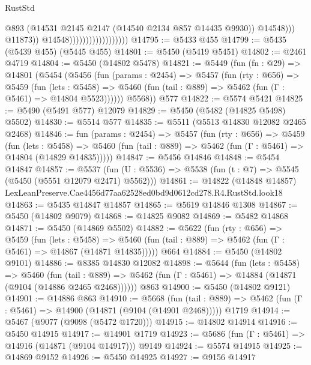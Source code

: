 \begin{lexlean}{RustStd}
\begin{coremodule}
                                                  @893
                                                  (@14531
                                                    @2145
                                                    @2147
                                                    (@14540 @2134 @857 @14435 @9930))
                                                  @14548)))
                                            @11873))
                                        @14548))))))))))))))))))
@14795 := @5433 @455
@14799 := @5435 (@5439 @455) (@5445 @455)
@14801 := @5450 (@5419 @5451)
@14802 := @2461 @4719
@14804 := @5450 (@14802 @5478)
@14821 := @5449
    (fun (fn : @29) =>
    @14801
      (@5454
        (@5456
          (fun (params : @2454) =>
          @5457
            (fun (rty : @656) =>
            @5459
              (fun (lets : @5458) =>
              @5460 (fun (tail : @889) => @5462 (fun (Γ : @5461) => @14804 @5523))))))
        @5568))
    @577
@14822 := @5574 @5421
@14825 := @5490 (@5491 @577) @12079
@14829 := @5450 (@5482 (@14825 @5498) @5502)
@14830 := @5514 @577
@14835 := @5511 (@5513 @14830 @12082 @2465 @2468)
@14846 := fun (params : @2454) =>
  @5457
    (fun (rty : @656) =>
    @5459
      (fun (lets : @5458) =>
      @5460 (fun (tail : @889) => @5462 (fun (Γ : @5461) => @14804 (@14829 @14835)))))
@14847 := @5456 @14846
@14848 := @5454 @14847
@14857 := @5537
    (fun (U : @5536) => @5538 (fun (t : @7) => @5545 (@5450 (@5551 @12079 @2471) @5562)))
@14861 := @14822 (@14848 @14857) LexLeanPreserve.Cae4456d77aa62528ed0bd9d0612cd278.R4.RustStd.look18
@14863 := @5435 @14847 @14857
@14865 := @5619 @14846 @1308
@14867 := @5450 (@14802 @9079)
@14868 := @14825 @9082
@14869 := @5482 @14868
@14871 := @5450 (@14869 @5502)
@14882 := @5622
    (fun (rty : @656) =>
    @5459
      (fun (lets : @5458) =>
      @5460 (fun (tail : @889) => @5462 (fun (Γ : @5461) => @14867 (@14871 @14835)))))
    @664
@14884 := @5450 (@14802 @9101)
@14886 := @8385 @14830 @12082
@14898 := @5644
    (fun (lets : @5458) =>
    @5460
      (fun (tail : @889) =>
      @5462 (fun (Γ : @5461) => @14884 (@14871 (@9104 (@14886 @2465 @2468))))))
    @863
@14900 := @5450 (@14802 @9121)
@14901 := @14886 @863
@14910 := @5668
    (fun (tail : @889) => @5462 (fun (Γ : @5461) => @14900 (@14871 (@9104 (@14901 @2468)))))
    @1719
@14914 := @5467 (@9077 (@9098 (@5472 @1720)))
@14915 := @14802 @14914
@14916 := @5450 @14915
@14917 := @14901 @1719
@14923 := @5686 (fun (Γ : @5461) => @14916 (@14871 (@9104 @14917))) @9149
@14924 := @5574 @14915
@14925 := @14869 @9152
@14926 := @5450 @14925
@14927 := @9156 @14917

\end{coremodule}
\end{lexlean}
